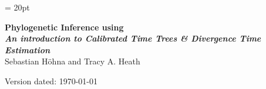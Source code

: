 \documentclass[11pt]{article}
\begin{document}
\renewcommand{\headrulewidth}{0.5pt}
\headsep = 20pt
\lhead{ }
\thispagestyle{plain}
\begin{center}

\textbf{\LARGE Phylogenetic Inference using \RevBayes}\\\vspace{2mm}
\textbf{\it{\Large An introduction to Calibrated Time Trees \& Divergence Time Estimation}}\\\vspace{2mm}
\vspace{1cm}
{\Large Sebastian H{\"o}hna and Tracy A. Heath}
\vspace{1cm}


\end{center}

\def \ResourcePath {./}
\def \GlobalResourcePath {../}



Version dated: \today
\end{document}
